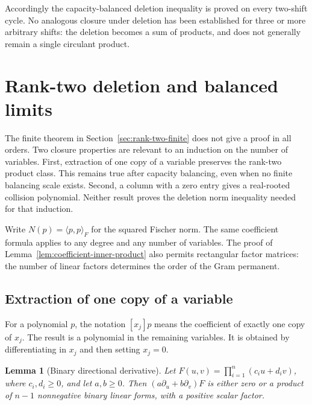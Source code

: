 \documentclass[11pt,a4paper]{article}
\newtheorem{lemma}[theorem]{Lemma}
\theoremstyle{definition}
\theoremstyle{remark}
\begin{document}
Accordingly the capacity-balanced deletion inequality is proved on every
two-shift cycle. No analogous closure under deletion has been
established for three or more arbitrary shifts: the deletion becomes a
sum of products, and does not generally remain a single circulant
product.


\section{Rank-two deletion and balanced limits}\label{sec:rank-two-closure}

The finite theorem in Section~\ref{sec:rank-two-finite} does not give a proof in all orders.
Two closure properties are relevant to an induction on the number of variables.
First, extraction of one copy of a variable preserves the rank-two product class.
This remains true after capacity balancing, even when no finite balancing scale exists.
Second, a column with a zero entry gives a real-rooted collision polynomial.
Neither result proves the deletion norm inequality needed for that induction.

Write $N(p)=\langle p,p\rangle_F$ for the squared Fischer norm.
The same coefficient formula applies to any degree and any number of variables.
The proof of Lemma~\ref{lem:coefficient-inner-product} also permits rectangular factor matrices:
the number of linear factors determines the order of the Gram permanent.

\subsection{Extraction of one copy of a variable}

For a polynomial $p$, the notation $[x_j]p$ means the coefficient of exactly one copy of $x_j$.
The result is a polynomial in the remaining variables.
It is obtained by differentiating in $x_j$ and then setting $x_j=0$.

\begin{lemma}[Binary directional derivative]\label{lem:r2-binary-derivative}
Let $F(u,v)=\prod_{i=1}^n(c_i u+d_i v)$, where $c_i,d_i\ge0$, and let $a,b\ge0$.
Then $(a\partial_u+b\partial_v)F$ is either zero or a product of $n-1$ nonnegative binary linear forms, with a positive scalar factor.
\end{lemma}
\end{document}
